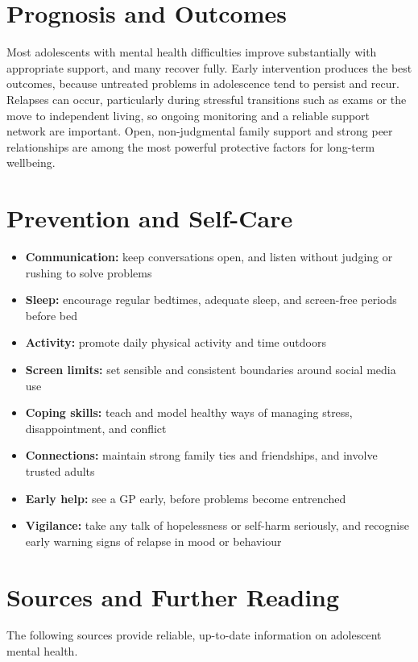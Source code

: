 \section*{Prognosis and Outcomes}
Most adolescents with mental health difficulties improve substantially with appropriate support, and many recover fully. Early intervention produces the best outcomes, because untreated problems in adolescence tend to persist and recur. Relapses can occur, particularly during stressful transitions such as exams or the move to independent living, so ongoing monitoring and a reliable support network are important. Open, non-judgmental family support and strong peer relationships are among the most powerful protective factors for long-term wellbeing.

\section*{Prevention and Self-Care}
\begin{itemize}
    \item \textbf{Communication:} keep conversations open, and listen without judging or rushing to solve problems
    \item \textbf{Sleep:} encourage regular bedtimes, adequate sleep, and screen-free periods before bed
    \item \textbf{Activity:} promote daily physical activity and time outdoors
    \item \textbf{Screen limits:} set sensible and consistent boundaries around social media use
    \item \textbf{Coping skills:} teach and model healthy ways of managing stress, disappointment, and conflict
    \item \textbf{Connections:} maintain strong family ties and friendships, and involve trusted adults
    \item \textbf{Early help:} see a GP early, before problems become entrenched
    \item \textbf{Vigilance:} take any talk of hopelessness or self-harm seriously, and recognise early warning signs of relapse in mood or behaviour
\end{itemize}

\section*{Sources and Further Reading}
The following sources provide reliable, up-to-date information on adolescent mental health.

